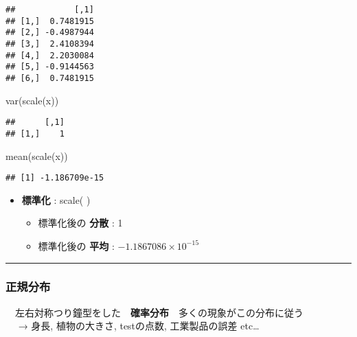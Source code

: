 \documentclass[
]{article}
\newenvironment{Shaded}{\begin{snugshade}}{\end{snugshade}}
\newcommand{\FunctionTok}[1]{\textcolor[rgb]{0.00,0.00,0.00}{#1}}
\newcommand{\NormalTok}[1]{#1}
\begin{document}
\begin{verbatim}
##            [,1]
## [1,]  0.7481915
## [2,] -0.4987944
## [3,]  2.4108394
## [4,]  2.2030084
## [5,] -0.9144563
## [6,]  0.7481915
\end{verbatim}

\begin{Shaded}
\begin{Highlighting}[]
\FunctionTok{var}\NormalTok{(}\FunctionTok{scale}\NormalTok{(x))}
\end{Highlighting}
\end{Shaded}

\begin{verbatim}
##      [,1]
## [1,]    1
\end{verbatim}

\begin{Shaded}
\begin{Highlighting}[]
\FunctionTok{mean}\NormalTok{(}\FunctionTok{scale}\NormalTok{(x))}
\end{Highlighting}
\end{Shaded}

\begin{verbatim}
## [1] -1.186709e-15
\end{verbatim}

\begin{itemize}
\item
  \textbf{標準化} : scale( )

  \begin{itemize}
  \item
    標準化後の \textbf{分散} : 1
  \item
    標準化後の \textbf{平均} : \ensuremath{-1.1867086\times 10^{-15}}
  \end{itemize}
\end{itemize}

\begin{center}\rule{0.5\linewidth}{0.5pt}\end{center}

\hypertarget{ux6b63ux898fux5206ux5e03}{%
\subsubsection{正規分布}\label{ux6b63ux898fux5206ux5e03}}

　左右対称つり鐘型をした　\textbf{確率分布}　多くの現象がこの分布に従う
　\\
　 → 身長, 植物の大きさ, testの点数, 工業製品の誤差 etc\ldots{}
\end{document}
